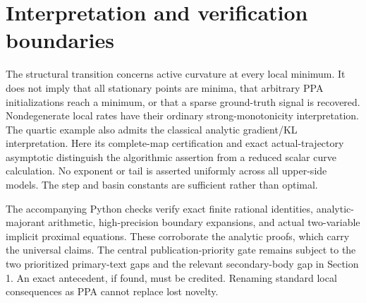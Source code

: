 \documentclass[11pt]{article}
\theoremstyle{remark}\newtheorem{remark}[theorem]{Remark}
\begin{document}
\section{Interpretation and verification boundaries}
The structural transition concerns active curvature at every local minimum.
It does not imply that all stationary points are minima, that arbitrary
PPA initializations reach a minimum, or that a sparse ground-truth signal
is recovered. Nondegenerate local rates have their ordinary
strong-monotonicity interpretation. The quartic example also admits the
classical analytic gradient/KL interpretation. Here its complete-map
certification and exact actual-trajectory asymptotic distinguish the
algorithmic assertion from a reduced scalar curve calculation.
No exponent or tail is asserted uniformly across all upper-side models.
The step and basin constants are sufficient rather than optimal.

The accompanying Python checks verify exact finite rational identities,
analytic-majorant arithmetic, high-precision boundary expansions, and
actual two-variable implicit proximal equations. These corroborate the
analytic proofs, which carry the universal claims. The central
publication-priority gate remains subject to the two prioritized primary-text
gaps and the relevant secondary-body gap in Section 1.
An exact antecedent, if found, must be credited.
Renaming standard local consequences as PPA cannot replace lost novelty.
\end{document}

